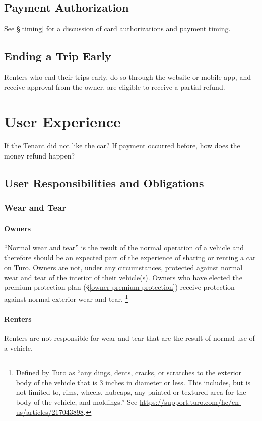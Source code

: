 \documentclass[review,12pt]{elsarticle}
\begin{document}
  \subsection{Payment Authorization}
  See \S\ref{timing} for a discussion of card authorizations and payment timing.

  \subsection{Ending a Trip Early}
  Renters who end their trips early, do so through the website or mobile app, and receive approval from the owner, are eligible to receive a partial refund.


\section{User Experience}

If the Tenant did not like the car? If payment occurred before, how does the money refund happen?


\subsection{User Responsibilities and Obligations}
  \subsubsection{Wear and Tear}
    \paragraph{Owners}
    ``Normal wear and tear'' is the result of the normal operation of a vehicle and therefore should be an expected part of the experience of sharing or renting a car on Turo. Owners are not, under any circumstances, protected against normal wear and tear of the interior of their vehicle(s). Owners who have elected the premium protection plan (\S\ref{owner-premium-protection}) receive protection against normal exterior wear and tear.
      \footnote{Defined by Turo as ``any dings, dents, cracks, or scratches to the exterior body of the vehicle that is 3 inches in diameter or less. This includes, but is not limited to, rims, wheels, hubcaps, any painted or textured area for the body of the vehicle, and moldings.'' See \url{https://support.turo.com/hc/en-us/articles/217043898}.
      }
    \paragraph{Renters}
    Renters are not responsible for wear and tear that are the result of normal use of a vehicle.
\end{document}

